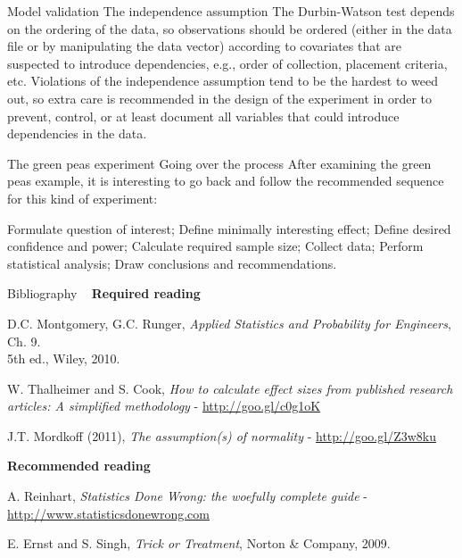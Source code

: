 \documentclass[t]{beamer}
\begin{document}

\begin{ftstf}
{Model validation}
{The independence assumption}
The Durbin-Watson test depends on the ordering of the data, so observations should be ordered (either in the data file or by manipulating the data vector) according to covariates that are suspected to introduce dependencies, e.g., order of collection, placement criteria, etc.
\vone
Violations of the independence assumption tend to be the hardest to weed out, so extra care is recommended in the design of the experiment in order to prevent, control, or at least document all variables that could introduce dependencies in the data.
\end{ftstf}


\begin{ftst}
{The green peas experiment}
{Going over the process}
After examining the green peas example, it is interesting to go back and follow the recommended sequence for this kind of experiment:

\bitems Formulate question of interest;
	\spitem Define minimally interesting effect;
	\spitem Define desired confidence and power;
	\spitem Calculate required sample size;
	\spitem Collect data;
	\spitem Perform statistical analysis;
	\spitem Draw conclusions and recommendations.
\eitem
{}
\end{ftst}



\begin{ftst}
{Bibliography}
{\ }
\scriptsize
\textbf{Required reading}

\benums D.C. Montgomery, G.C. Runger, \textit{Applied Statistics and Probability for Engineers}, Ch. 9.\\5th ed., Wiley, 2010. 
\item W. Thalheimer and S. Cook, \textit{How to calculate effect sizes from published research articles: A simplified methodology} - {\tiny\url{http://goo.gl/c0g1oK}}
\item J.T. Mordkoff (2011), \textit{The assumption(s) of normality} - \url{http://goo.gl/Z3w8ku}
\eenum

\textbf{Recommended reading}

\benums A. Reinhart, \textit{Statistics Done Wrong: the woefully complete guide} - {\tiny\url{http://www.statisticsdonewrong.com}}
\item E. Ernst and S. Singh, \textit{Trick or Treatment}, Norton \& Company, 2009.
\eenum
\end{ftst}
\end{document}
